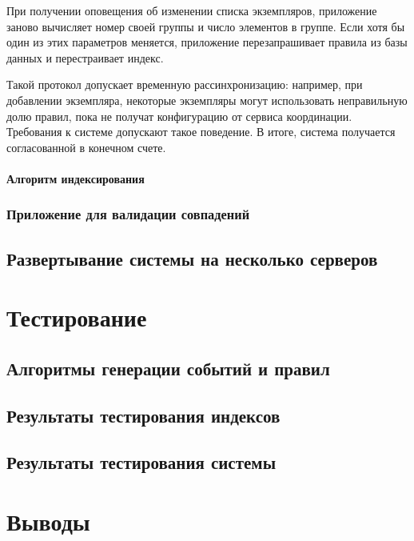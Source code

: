 \documentclass[14pt]{article}
\begin{document}
При получении оповещения об изменении списка экземпляров, приложение заново вычисляет номер своей группы и число элементов в группе. Если хотя бы один из этих параметров меняется, приложение перезапрашивает правила из базы данных и перестраивает индекс.

Такой протокол допускает временную рассинхронизацию: например, при добавлении экземпляра, некоторые экземпляры могут использовать неправильную долю правил, пока не получат конфигурацию от сервиса координации. Требования к системе допускают такое поведение. В итоге, система получается согласованной в конечном счете.

\paragraph{Алгоритм индексирования}

\subsubsection{Приложение для валидации совпадений}
\subsection{Развертывание системы на несколько серверов}

\section{Тестирование}
\label{section:testing}
\subsection{Алгоритмы генерации событий и правил}
\subsection{Результаты тестирования индексов}
\subsection{Результаты тестирования системы}

\section{Выводы}
\end{document}

